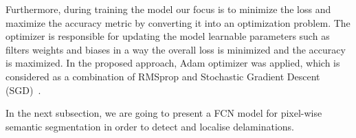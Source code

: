Furthermore, during training the model our focus is to minimize the loss and maximize the accuracy metric by converting it into an optimization problem. 
The optimizer is responsible for updating the model learnable parameters such as filters weights and biases in a way the overall loss is minimized and the accuracy is maximized.
In the proposed approach, Adam optimizer was applied, which is considered as a combination of RMSprop and Stochastic Gradient Descent (SGD)~\cite{Kingma2015}. 

In the next subsection, we are going to present a FCN model for pixel-wise semantic segmentation in order to detect and localise delaminations.
